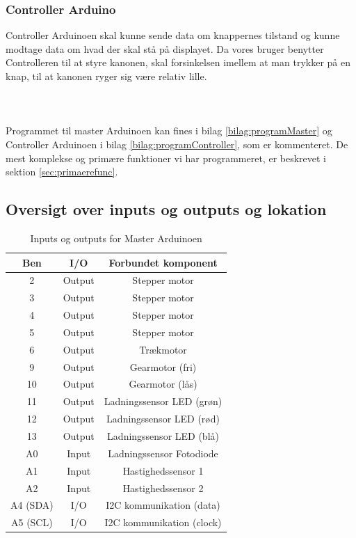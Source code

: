 \subsubsection{Controller Arduino}
Controller Arduinoen skal kunne sende data om knappernes tilstand og kunne modtage data om hvad der skal stå på displayet. Da vores bruger benytter Controlleren til at styre kanonen, skal forsinkelsen imellem at man trykker på en knap, til at kanonen ryger sig være relativ lille.\\
\\
\\
\\
Programmet til master Arduinoen kan fines i bilag \ref{bilag:programMaster} og Controller Arduinoen i bilag \ref{bilag:programController}, som er kommenteret. De mest komplekse og primære funktioner vi har programmeret, er beskrevet i sektion \ref{sec:primaerefunc}.
\subsection{Oversigt over inputs og outputs og lokation}
\begin{table}[H]
	\caption{Inputs og outputs for Master Arduinoen} %
	\label{tab:IOMaster}
	\centering
		\begin{tabular}{c|c c} 
		Ben & I/O & Forbundet komponent\\ [0.5ex] 
		\hline 
			2 & Output & Stepper motor\\
			3 & Output & Stepper motor\\
			4 & Output & Stepper motor\\
			5 & Output & Stepper motor\\
			6 & Output & Trækmotor\\
			9 & Output & Gearmotor (fri)\\
			10 & Output & Gearmotor (lås)\\
			11 & Output & Ladningssensor LED (grøn)\\
			12 & Output & Ladningssensor LED (rød)\\
			13 & Output & Ladningssensor LED (blå)\\
			A0 & Input & Ladningssensor Fotodiode\\
			A1 & Input & Hastighedssensor 1\\			
			A2 & Input & Hastighedssensor 2\\
			A4 (SDA) & I/O & I2C kommunikation (data)\\
			A5 (SCL) & I/O & I2C kommunikation (clock)\\[1ex]
		\hline %
	\end{tabular}
\end{table}

